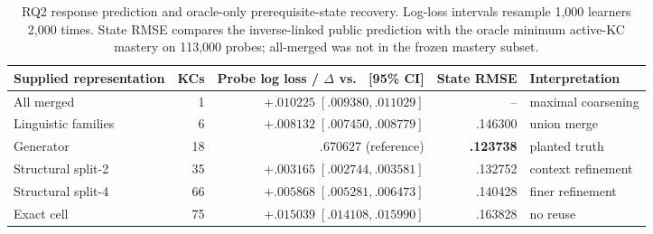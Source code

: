 \begin{table}[t]
  \centering
  \small
  \begin{tabular}{@{}lrrrl@{}}
    \toprule
    Supplied representation & KCs &
      Probe log loss / $\Delta$ vs.\ \kstar{} [95\% CI] &
      State RMSE & Interpretation \\
    \midrule
    All merged & 1 & $+.010225\;[.009380,.011029]$ & -- & maximal coarsening \\
    Linguistic families & 6 & $+.008132\;[.007450,.008779]$ & .146300 & union merge \\
    Generator \kstar{} & 18 & $.670627$ (reference) & \textbf{.123738} & planted truth \\
    Structural split-2 & 35 & $+.003165\;[.002744,.003581]$ & .132752 & context refinement \\
    Structural split-4 & 66 & $+.005868\;[.005281,.006473]$ & .140428 & finer refinement \\
    Exact cell & 75 & $+.015039\;[.014108,.015990]$ & .163828 & no reuse \\
    \bottomrule
  \end{tabular}
  \caption{RQ2 response prediction and oracle-only prerequisite-state recovery.
  Log-loss intervals resample 1,000 learners 2,000 times.  State RMSE compares
  the inverse-linked public prediction with the oracle minimum active-KC
  mastery on 113,000 probes; all-merged was not in the frozen mastery subset.}
  \label{tab:kt-results}
\end{table}
